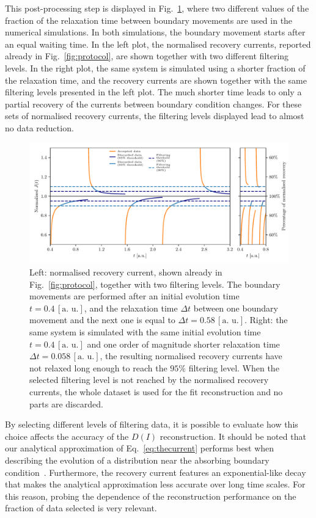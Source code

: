 This post-processing step is displayed in Fig.~\ref{fig:postprocessing}, where two different values of the fraction of the relaxation time between boundary movements are used in the numerical simulations. In both simulations, the boundary movement starts after an equal waiting time. In the left plot, the normalised recovery currents, reported already in Fig.~\ref{fig:protocol}, are shown together  with two different filtering levels. In the right plot, the same system is simulated using a shorter fraction of the relaxation time, and the recovery currents are shown together with the same filtering levels presented in the left plot. The much shorter time leads to only a partial recovery of the currents between boundary condition changes. For these sets of normalised recovery currents, the filtering levels displayed lead to almost no data reduction.
%
\begin{figure}[htp]
    \centering 
    \includegraphics[width=\textwidth]{4_probing_the_diffusive_behavior/figs/final/the_discarded_data.pdf}
    \caption{Left: normalised recovery current, shown already in Fig.~\ref{fig:protocol}, together with two filtering levels. The boundary movements are performed after an initial evolution time $t=0.4 \, [\text{a. u.}]$, and the relaxation time $\Delta t$ between one boundary movement and the next one is equal to $\Delta t=0.58 \, [\text{a. u.}]$. Right: the same system is simulated with the same initial evolution time $t=0.4 \, [\text{a. u.}]$ and one order of magnitude shorter relaxation time $\Delta t=0.058 \, [\text{a. u.}]$, the resulting normalised recovery currents have not relaxed long enough to reach the $95\%$ filtering level. When the selected filtering level is not reached by the normalised recovery currents, the whole dataset is used for the fit reconstruction and no parts are discarded.}
    \label{fig:postprocessing}
\end{figure}
%

By selecting different levels of filtering data, it is possible to evaluate how this choice affects the accuracy of the $D(I)$ reconstruction. It should be noted that our analytical approximation of Eq.~\eqref{eq:thecurrent} performs best when describing the evolution of a distribution near the absorbing boundary condition~\cite{montanari:ipac2021:tupab233}. Furthermore, the recovery current features an exponential-like decay that makes the analytical approximation less accurate over long time scales. For this reason, probing the dependence of the reconstruction performance on the fraction of data selected is very relevant.

